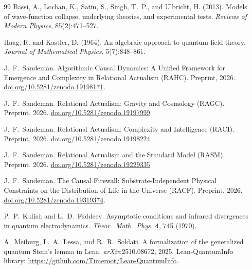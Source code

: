\documentclass[11pt,a4paper]{article}
\theoremstyle{plain}
\theoremstyle{definition}
\theoremstyle{remark}
\begin{document}
\begin{thebibliography}{99}
Bassi, A., Lochan, K., Satin, S., Singh, T.~P., and Ulbricht, H. (2013).
\newblock Models of wave-function collapse, underlying theories, and experimental
  tests.
\newblock \emph{Reviews of Modern Physics}, 85(2):471--527.

Haag, R. and Kastler, D. (1964).
\newblock An algebraic approach to quantum field theory.
\newblock \emph{Journal of Mathematical Physics}, 5(7):848--861.

J.~F.~Sandeman.
\newblock Algorithmic Causal Dynamics: A Unified Framework for Emergence and
  Complexity in Relational Actualism ({RAHC}).
\newblock Preprint, 2026.
\newblock \href{https://doi.org/10.5281/zenodo.19198171}{doi.org/10.5281/zenodo.19198171}.

J.~F.~Sandeman.
\newblock Relational Actualism: Gravity and Cosmology ({RAGC}).
\newblock Preprint, 2026.
\newblock \href{https://doi.org/10.5281/zenodo.19197999}{doi.org/10.5281/zenodo.19197999}.

J.~F.~Sandeman.
\newblock Relational Actualism: Complexity and Intelligence ({RACI}).
\newblock Preprint, 2026.
\newblock \href{https://doi.org/10.5281/zenodo.19198224}{doi.org/10.5281/zenodo.19198224}.

J.~F.~Sandeman.
\newblock Relational Actualism and the Standard Model ({RASM}).
\newblock Preprint, 2026.
\newblock \href{https://doi.org/10.5281/zenodo.19229335}{doi.org/10.5281/zenodo.19229335}.

J.~F.~Sandeman.
\newblock The Causal Firewall: Substrate-Independent Physical Constraints
  on the Distribution of Life in the Universe ({RACF}).
\newblock Preprint, 2026.
\newblock \href{https://doi.org/10.5281/zenodo.19319374}{doi.org/10.5281/zenodo.19319374}.


P.~P.~Kulish and L.~D.~Faddeev.
\newblock Asymptotic conditions and infrared divergences in quantum electrodynamics.
\newblock \textit{Theor.~Math.~Phys.} \textbf{4}, 745 (1970).

A.~Meiburg, L.~A.~Lessa, and R.~R.~Soldati.
\newblock A formalization of the generalized quantum {Stein's} lemma in {Lean}.
\newblock \textit{arXiv}:2510.08672, 2025.
\newblock Lean-QuantumInfo library: \url{https://github.com/Timeroot/Lean-QuantumInfo}.

\end{thebibliography}
\end{document}
